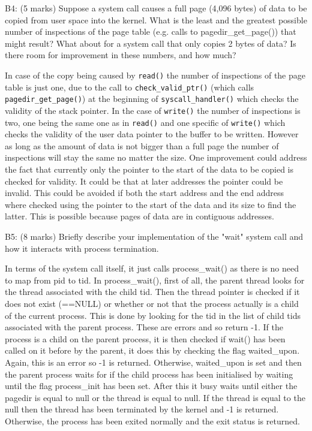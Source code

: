 
\noindent B4: (5 marks)
Suppose a system call causes a full page (4,096 bytes) of data
to be copied from user space into the kernel.  What is the least and the greatest possible number of inspections of the page table (e.g. calls to pagedir\_get\_page()) that might result?  What about for a system call that only copies 2 bytes of data?  Is there room for improvement in these numbers, and how much?


In case of the copy being caused by \texttt{read()} the number of inspections of the page table is just one, due to the call to \texttt{check\_valid\_ptr()} (which calls \texttt{pagedir\_get\_page()}) at the beginning of \texttt{syscall\_handler()} which checks the validity of the stack pointer. In the case of \texttt{write()} the number of inspections is two, one being the same one as in \texttt{read()} and one specific of \texttt{write()} which checks the validity of the user data pointer to the buffer to be written.
However as long as the amount of data is not bigger than a full page the number of inspections will stay the same no matter the size.
One improvement could address the fact that currently only the pointer to the start of the data to be copied is checked for validity. It could be that at later addresses the pointer could be invalid. This could be avoided if both the start address and the end address where checked using the pointer to the start of the data and its size to find the latter. This is possible because pages of data are in contiguous addresses.


\noindent B5: (8 marks)
Briefly describe your implementation of the "wait" system call
and how it interacts with process termination.


In terms of the system call itself, it just calls process\_wait() as there is no need to map from pid to tid. In process\_wait(), first of all, the parent thread looks for the thread associated with the child tid. Then the thread pointer is checked if it does not exist (==NULL) or whether or not that the process actually is a child of the current process. This is done by looking for the tid in the list of child tids associated with the parent process. These are errors and so return -1.
If the process is a child on the parent process, it is then checked if wait() has been called on it before by the parent, it does this by checking the flag waited\_upon. Again, this is an error so -1 is returned. Otherwise, waited\_upon is set and then the parent process waits for if the child process has been initialised by waiting until the flag process\_init has been set. After this it busy waits until either the pagedir is equal to null or the thread is equal to null. If the thread is equal to the null then the thread has been terminated by the kernel and -1 is returned. Otherwise, the process has been exited normally and the exit status is returned.

